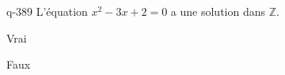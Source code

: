 \begin{truefalse}{q-389}
L'équation $x^2-3x+2=0$ a une solution dans $\mathbb Z$.
\item* Vrai
\item Faux
\end{truefalse}

